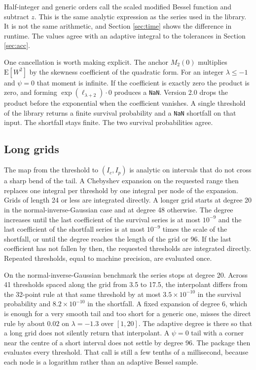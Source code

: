 \documentclass[article]{jss}
\begin{document}
Half-integer and generic orders call the scaled modified Bessel function and subtract $z$.
This is the same analytic expression as the series used in the  library.
It is not the same arithmetic, and Section \ref{sec:time} shows the difference in runtime.
The values agree with an adaptive integral to the tolerances in Section \ref{sec:acc}.

One cancellation is worth making explicit.
The anchor $M_2(0)$ multiplies $\mathrm{E}[W^2]$ by the skewness coefficient of the quadratic form.
For an integer $\lambda\le -1$ and $\psi=0$ that moment is infinite.
If the coefficient is exactly zero the product is zero, and forming $\exp(\ell_{\lambda+2})\cdot 0$ produces a \texttt{NaN}.
Version 2.0 drops the product before the exponential when the coefficient vanishes.
A single threshold of the  library returns a finite survival probability and a \texttt{NaN} shortfall on that input.
The  shortfall stays finite.
The two survival probabilities agree.

\subsection{Long grids} \label{sec:cheb}

The map from the threshold to $(I_c,I_p)$ is analytic on intervals that do not cross a sharp bend of the tail.
A Chebyshev expansion on the requested range then replaces one integral per threshold by one integral per node of the expansion.
Grids of length 24 or less are integrated directly.
A longer grid starts at degree 20 in the normal-inverse-Gaussian case and at degree 48 otherwise.
The degree increases until the last coefficient of the survival series is at most $10^{-9}$ and the last coefficient of the shortfall series is at most $10^{-9}$ times the scale of the shortfall, or until the degree reaches the length of the grid or 96.
If the last coefficient has not fallen by then, the requested thresholds are integrated directly.
Repeated thresholds, equal to machine precision, are evaluated once.

On the normal-inverse-Gaussian benchmark the series stops at degree 20.
Across 41 thresholds spaced along the grid from 3.5 to 17.5, the interpolant differs from the 32-point rule at that same threshold by at most $3.5\times 10^{-10}$ in the survival probability and $8.2\times 10^{-10}$ in the shortfall.
A fixed expansion of degree 6, which is enough for a very smooth tail and too short for a generic one, misses the direct rule by about $0.02$ on $\lambda=-1.3$ over $[1,20]$.
The adaptive degree is there so that a long grid does not silently return that interpolant.
A $\psi=0$ tail with a corner near the centre of a short interval does not settle by degree 96.
The package then evaluates every threshold.
That call is still a few tenths of a millisecond, because each node is a logarithm rather than an adaptive Bessel sample.
\end{document}
